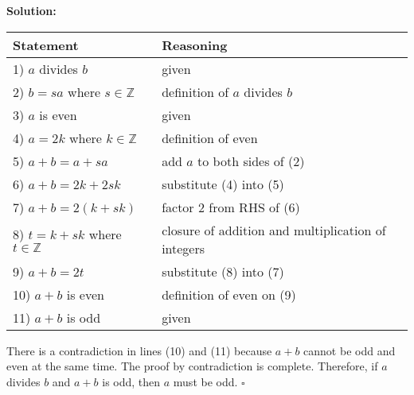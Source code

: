 \documentclass{article}
\newenvironment{solution}
{
\par
\color{blue}
\textbf{Solution:}
}
{
\par
}
\begin{document}
\begin{enumerate}
\begin{itemize}
\begin{solution}
    \begin{tabular}{l|l}
        Statement & Reasoning \\ \hline
        1) $a$ divides $b$ & given \\
        2) $b = sa$ where $s \in \mathbb{Z}$ & definition of $a$ divides $b$ \\
        3) $a$ is even & given \\
        4) $a = 2k$ where $k \in \mathbb{Z}$ & definition of even \\
        5) $a + b = a + sa$ & add $a$ to both sides of (2) \\
        6) $a + b = 2k + 2sk$ & substitute (4) into (5) \\
        7) $a + b = 2(k + sk)$ & factor 2 from RHS of (6) \\
        8) $t = k + sk$ where $t \in \mathbb{Z}$ & closure of addition and multiplication of integers \\
        9) $a + b = 2t$ & substitute (8) into (7) \\
        10) $a + b$ is even & definition of even on (9) \\
        11) $a + b$ is odd & given
    \end{tabular}
    
    There is a contradiction in lines (10) and (11) because $a + b$ cannot be odd and even at the same time. The proof by contradiction is complete. Therefore, if $a$ divides $b$ and $a + b$ is odd, then $a$ must be odd. $\square$
    \end{solution}
    
\end{itemize}


\end{enumerate}
\end{document}
